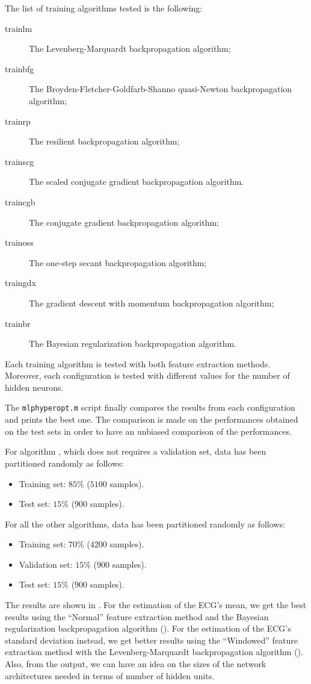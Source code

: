 The list of training algorithms tested is the following:
\begin{description}
\item[trainlm] The Levenberg-Marquardt backpropagation algorithm;
\item[trainbfg] The Broyden-Fletcher-Goldfarb-Shanno quasi-Newton
	backpropagation algorithm;
\item[trainrp] The resilient backpropagation algorithm;
\item[trainscg] The scaled conjugate gradient backpropagation algorithm.
\item[traincgb] The conjugate gradient backpropagation algorithm;
\item[trainoss] The one-step secant backpropagation algorithm;
\item[traingdx] The gradient descent with momentum backpropagation algorithm;
\item[trainbr] The Bayesian regularization backpropagation algorithm.
\end{description}

Each training algorithm is tested with both feature extraction methods.
Moreover, each configuration is tested with different values for the number of
hidden neurons.

The \texttt{mlphyperopt.m} script finally compares the results from each
configuration and prints the best one. The comparison is made on the
performances obtained on the test sets in order to have an unbiased comparison
of the performances.

For algorithm , which does not requires a validation set, data
has been partitioned randomly as follows:
\begin{itemize}
\item Training set: \(85\%\) (\(5100\) samples).
\item Test set: \(15\%\) (\(900\) samples).
\end{itemize}
For all the other algorithms, data has been partitioned randomly as follows:
\begin{itemize}
\item Training set: \(70\%\) (\(4200\) samples).
\item Validation set: \(15\%\) (\(900\) samples).
\item Test set: \(15\%\) (\(900\) samples).
\end{itemize}

The results are shown in . For the estimation of the
ECG's mean, we get the best results using the ``Normal'' feature extraction
method and the Bayesian regularization backpropagation algorithm
(). For the estimation of the ECG's standard deviation instead,
we get better results using the ``Windowed'' feature extraction method with the
Levenberg-Marquardt backpropagation algorithm (). Also, from the
output, we can have an idea on the sizes of the network architectures needed in
terms of number of hidden units.

